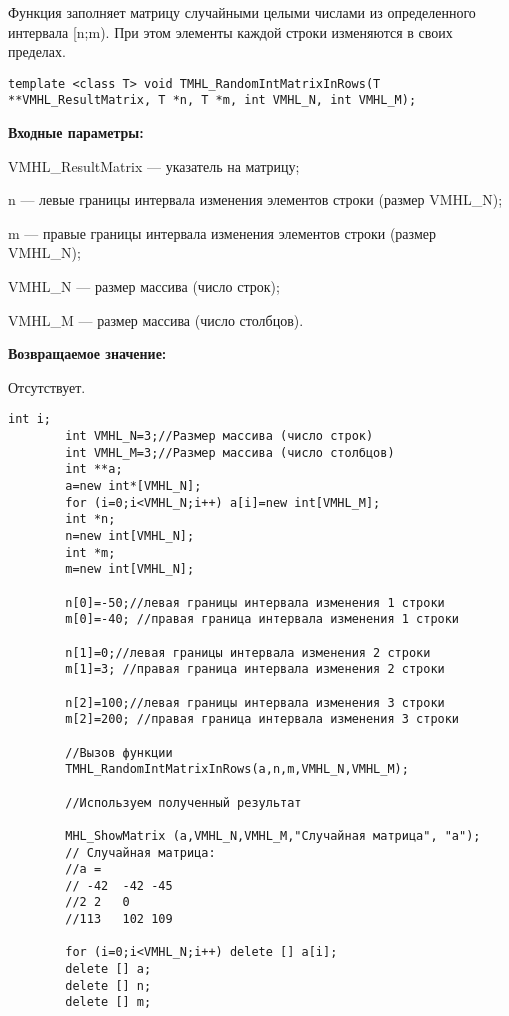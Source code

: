 \documentclass[a4paper,12pt]{article}
\begin{document}
Функция заполняет матрицу случайными целыми числами из определенного интервала [n;m). При этом элементы каждой строки изменяются в своих пределах.


\begin{lstlisting}[label=code_syntax_TMHL_RandomIntMatrixInRows,caption=Синтаксис]
template <class T> void TMHL_RandomIntMatrixInRows(T **VMHL_ResultMatrix, T *n, T *m, int VMHL_N, int VMHL_M);
\end{lstlisting}

\textbf{Входные параметры:}
 
VMHL\_ResultMatrix --- указатель на матрицу;
 
n --- левые границы интервала изменения элементов строки (размер VMHL\_N);
 
m --- правые границы интервала изменения элементов строки (размер VMHL\_N);
 
VMHL\_N --- размер массива (число строк);
 
VMHL\_M --- размер массива (число столбцов).

\textbf{Возвращаемое значение:}

Отсутствует.


\begin{lstlisting}[label=code_use_TMHL_RandomIntMatrixInRows,caption=Пример использования]
        int i;
        int VMHL_N=3;//Размер массива (число строк)
        int VMHL_M=3;//Размер массива (число столбцов)
        int **a;
        a=new int*[VMHL_N];
        for (i=0;i<VMHL_N;i++) a[i]=new int[VMHL_M];
        int *n;
        n=new int[VMHL_N];
        int *m;
        m=new int[VMHL_N];

        n[0]=-50;//левая границы интервала изменения 1 строки
        m[0]=-40; //правая граница интервала изменения 1 строки

        n[1]=0;//левая границы интервала изменения 2 строки
        m[1]=3; //правая граница интервала изменения 2 строки

        n[2]=100;//левая границы интервала изменения 3 строки
        m[2]=200; //правая граница интервала изменения 3 строки

        //Вызов функции
        TMHL_RandomIntMatrixInRows(a,n,m,VMHL_N,VMHL_M);

        //Используем полученный результат

        MHL_ShowMatrix (a,VMHL_N,VMHL_M,"Случайная матрица", "a");
        // Случайная матрица:
        //a =
        // -42	-42	-45
        //2	2	0
        //113	102	109

        for (i=0;i<VMHL_N;i++) delete [] a[i];
        delete [] a;
        delete [] n;
        delete [] m;
\end{lstlisting}
\end{document}
